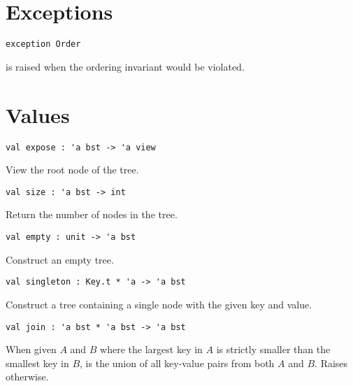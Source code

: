 \section{Exceptions}

\begin{gram}
\begin{verbatim}
exception Order
\end{verbatim}
 is raised when the ordering invariant would be violated.
\end{gram}


\section{Values}

\begin{gram}[expose]
\begin{verbatim}
val expose : 'a bst -> 'a view
\end{verbatim}
View the root node of the tree.
\end{gram}

\begin{gram}[size]
\begin{verbatim}
val size : 'a bst -> int
\end{verbatim}
Return the number of nodes in the tree.
\end{gram}

\begin{gram}[empty]
\begin{verbatim}
val empty : unit -> 'a bst
\end{verbatim}
Construct an empty tree.
\end{gram}

\begin{gram}[singleton]
\begin{verbatim}
val singleton : Key.t * 'a -> 'a bst
\end{verbatim}
Construct a tree containing a single node with the given key and value.
\end{gram}

\begin{gram}[join]
\begin{verbatim}
val join : 'a bst * 'a bst -> 'a bst
\end{verbatim}
When given $A$ and $B$ where the largest key in $A$ is strictly smaller than
the smallest key in $B$,  is the union of all key-value pairs
from both $A$ and $B$. Raises  otherwise.
\end{gram}

